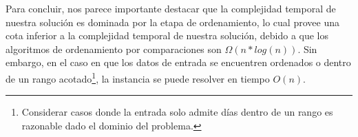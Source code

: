 Para concluir, nos parece importante destacar que la complejidad temporal de nuestra solución es dominada por la etapa de ordenamiento, lo cual provee una cota inferior a la complejidad temporal de nuestra solución, debido a que los algoritmos de ordenamiento por comparaciones son $\Omega(n * log(n))$. Sin embargo, en el caso en que los datos de entrada se encuentren ordenados o dentro de un rango acotado\footnote{Considerar casos donde la entrada solo admite días dentro de un rango es razonable dado el dominio del problema.}, la instancia se puede resolver en tiempo $O(n)$.

